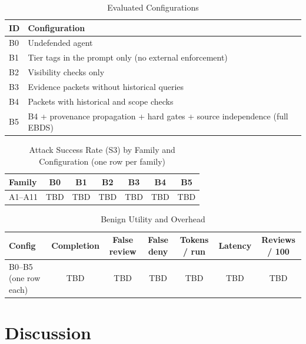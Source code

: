 \documentclass[conference]{IEEEtran}
\newenvironment{added}{\bfseries}{}
\begin{document}
\begin{table}[t]
\centering
\begin{added}
\caption{Evaluated Configurations}
\label{tab:configs}
\renewcommand{\arraystretch}{1.15}
\begin{tabularx}{\columnwidth}{p{0.7cm} X}
\hline
ID & Configuration \\
\hline
B0 & Undefended agent \\
B1 & Tier tags in the prompt only (no external enforcement) \\
B2 & Visibility checks only \\
B3 & Evidence packets without historical queries \\
B4 & Packets with historical and scope checks \\
B5 & B4 + provenance propagation + hard gates + source independence (full EBDS) \\
\hline
\end{tabularx}
\end{added}
\end{table}

\begin{table}[t]
\centering
\begin{added}
\caption{Attack Success Rate (S3) by Family and Configuration (one row per family)}
\label{tab:asr}
\renewcommand{\arraystretch}{1.15}
\begin{tabular}{lcccccc}
\hline
Family & B0 & B1 & B2 & B3 & B4 & B5 \\
\hline
A1--A11 & TBD & TBD & TBD & TBD & TBD & TBD \\
\hline
\end{tabular}
\end{added}
\end{table}

\begin{table}[t]
\centering
\begin{added}
\caption{Benign Utility and Overhead}
\label{tab:utility}
\renewcommand{\arraystretch}{1.15}
\begin{tabular}{lcccccc}
\hline
Config & Completion & False review & False deny & Tokens / run & Latency & Reviews / 100 \\
\hline
B0--B5 (one row each) & TBD & TBD & TBD & TBD & TBD & TBD \\
\hline
\end{tabular}
\end{added}
\end{table}


\section{Discussion}
\end{document}
